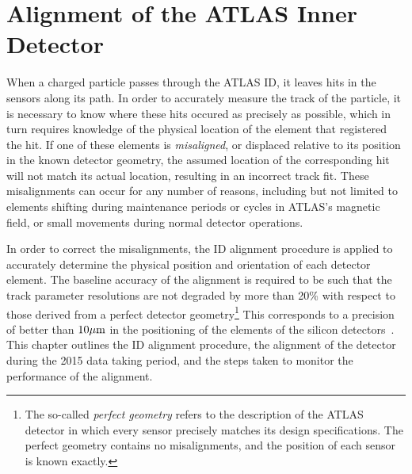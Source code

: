 \chapter[Alignment of the ATLAS Inner Detector][Alignment of the ATLAS Inner Detector]{Alignment of the ATLAS Inner Detector}
\label{ch:alignment}

When a charged particle passes through the ATLAS ID, it leaves hits in the sensors along its path.
In order to accurately measure the track of the particle, it is necessary to know where these hits occured as precisely as possible, which in turn requires knowledge of the physical location of the element that registered the hit.
If one of these elements is \emph{misaligned}, or displaced relative to its position in the known detector geometry, the assumed location of the corresponding hit will not match its actual location, resulting in an incorrect track fit.
These misalignments can occur for any number of reasons, including but not limited to elements shifting during maintenance periods or cycles in ATLAS's magnetic field, or small movements during normal detector operations.

In order to correct the misalignments, the ID alignment procedure is applied to accurately determine the physical position and orientation of each detector element.
The baseline accuracy of the alignment is required to be such that the track parameter resolutions are not degraded by more than 20\% with respect to those derived from a perfect detector geometry\footnote{The so-called \emph{perfect geometry} refers to the description of the ATLAS detector in which every sensor precisely matches its design specifications.  The perfect geometry contains no misalignments, and the position of each sensor is known exactly.}
This corresponds to a precision of better than $10\mu\textrm{m}$ in the positioning of the elements of the silicon detectors~\cite{TDR-ID1}.
This chapter outlines the ID alignment procedure, the alignment of the detector during the 2015 data taking period, and the steps taken to monitor the performance of the alignment.  

